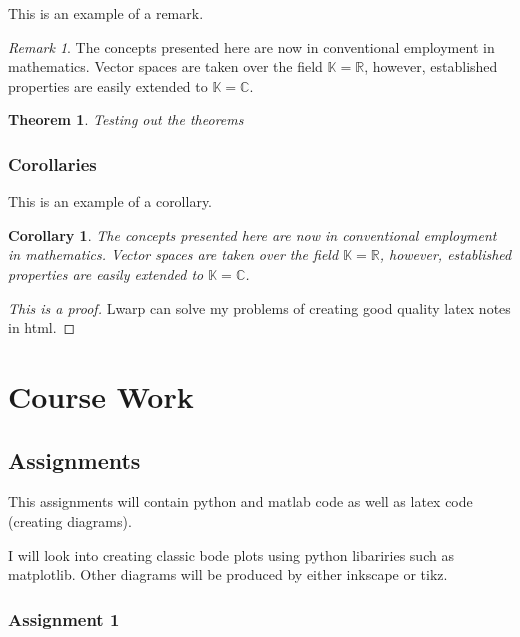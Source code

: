 \documentclass{scrreprt}
\theoremstyle{plain}
\newtheorem{theorem}{Theorem}[section]
\newtheorem{corollary}{Corollary}[theorem]
\theoremstyle{definition}
\theoremstyle{remark}
\newtheorem*{remark}{Remark}
\begin{document}
This is an example of a remark.

\begin{remark}
	The concepts presented here are now in conventional employment in mathematics. Vector spaces are taken over the field $\mathbb{K}=\mathbb{R}$, however, established properties are easily extended to $\mathbb{K}=\mathbb{C}$.
\end{remark}

\begin{theorem}
	Testing out the theorems
\end{theorem}

\section{Corollaries}

This is an example of a corollary.

\begin{corollary}
	The concepts presented here are now in conventional employment in mathematics. Vector spaces are taken over the field $\mathbb{K}=\mathbb{R}$, however, established properties are easily extended to $\mathbb{K}=\mathbb{C}$.
\end{corollary}


\begin{proof}[This is a proof]
	Lwarp can solve my problems of creating good quality latex notes in html.
\end{proof}

\part{Course Work}


\chapter{Assignments}
This assignments will contain python and matlab code as well as latex code (creating diagrams).

I will look into creating classic bode plots using python libariries such as matplotlib. Other diagrams will be produced by either inkscape or tikz.
\section{Assignment 1}
\end{document}
